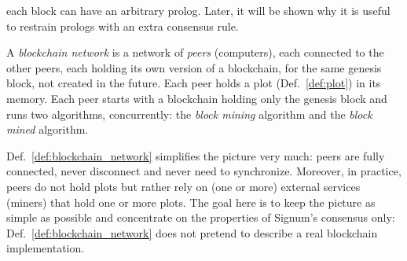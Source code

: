 each block can have an arbitrary prolog. Later, it will be shown why it is useful to
restrain prologs with an extra consensus rule.
%
\begin{definition}\label{def:blockchain_network}
  A \emph{blockchain network} is a
  network of \emph{peers} (computers), each connected to the other peers,
  each holding its own version of a blockchain, for the same genesis block,
  not created in the future.
  Each peer holds a plot (Def.~\ref{def:plot}) in its memory.
  Each peer starts with a blockchain holding only the genesis block and runs two
  algorithms, concurrently: the \emph{block mining} algorithm
  and the \emph{block mined} algorithm.
\end{definition}
%
Def.~\ref{def:blockchain_network} simplifies the picture very much:
peers are fully connected, never disconnect and never need to synchronize.
Moreover, in practice, peers do not hold plots but rather rely on (one or more)
external services (miners) that hold one or more plots.
The goal here is to keep the picture as simple as possible and concentrate on the properties of
Signum's consensus only: Def.~\ref{def:blockchain_network} does not pretend
to describe a real blockchain implementation.

